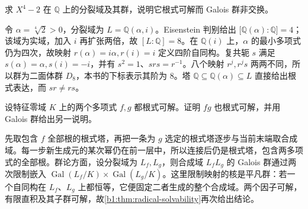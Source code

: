 \begin{exercise}\label{b1:ex:21-8}
	求 \(X^4-2\) 在 \(\mathbb Q\) 上的分裂域及其群，说明它根式可解而 Galois 群非交换。
\end{exercise}
\begin{solution}
	令 \(\alpha=\sqrt[4]{2}>0\)，分裂域为 \(L=\mathbb Q(\alpha,i)\)。Eisenstein 判别给出 \(\bigl[\mathbb Q(\alpha):\mathbb Q\bigr]=4\)；该域为实域，加入 \(i\) 再扩张两倍，故 \([L:\mathbb Q]=8\)。在 \(\mathbb Q(i)\) 上，\(\alpha\) 的最小多项式仍为四次，故映射 \(r(\alpha)=i\alpha,r(i)=i\) 定义四阶自同构。复共轭 \(s\) 满足 \(s(\alpha)=\alpha,s(i)=-i\)，并有 \(s^2=1\)、\(srs=r^{-1}\)。八个映射 \(r^j,r^js\) 两两不同，所以群为二面体群 \(D_8\)，本书的下标表示其阶为 \(8\)。塔 \(\mathbb Q\subseteq\mathbb Q(\alpha)\subseteq L\) 直接给出根式表达，而 \(sr\neq rs\)。
\end{solution}

\begin{exercise}\label{b1:ex:21-9}
	设特征零域 \(K\) 上的两个多项式 \(f,g\) 都根式可解。证明 \(fg\) 也根式可解，并用 Galois 群给出另一说明。
\end{exercise}
\begin{solution}
	先取包含 \(f\) 全部根的根式塔，再把一条为 \(g\) 选定的根式塔逐步与当前末端取合成域。每一步新生成元的某次幂仍在前一层中，所以连接后仍是根式塔，包含两多项式的全部根。群论方面，设分裂域为 \(L_f,L_g\)，则合成域 \(L_fL_g\) 的 Galois 群通过两次限制嵌入 \(\operatorname{Gal}(L_f/K)\times\operatorname{Gal}(L_g/K)\)。这里限制映射的核是平凡群：若一个自同构在 \(L_f\)、\(L_g\) 上都恒等，它便固定二者生成的整个合成域。两个因子可解，有限直积及其子群可解，故\cref{b1:thm:radical-solvability}再次给出结论。
\end{solution}

